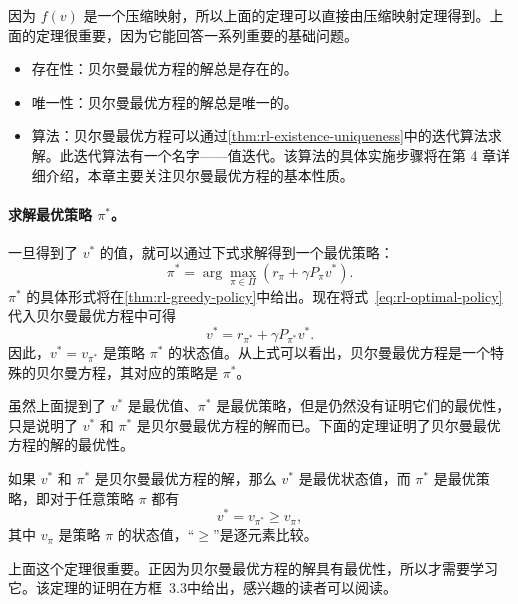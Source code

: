 因为 $f(v)$ 是一个压缩映射，所以上面的定理可以直接由压缩映射定理得到。上面的定理很重要，因为它能回答一系列重要的基础问题。
\begin{itemize}
  \item 存在性：贝尔曼最优方程的解总是存在的。
  \item 唯一性：贝尔曼最优方程的解总是唯一的。
  \item 算法：贝尔曼最优方程可以通过\cref{thm:rl-existence-uniqueness}中的迭代算法求解。此迭代算法有一个名字——值迭代。该算法的具体实施步骤将在第 4 章详细介绍，本章主要关注贝尔曼最优方程的基本性质。
\end{itemize}

\paragraph{求解最优策略 $\pi^*$。}一旦得到了 $v^*$ 的值，就可以通过下式求解得到一个最优策略：
\begin{equation}
  \pi^* = \arg\max_{\pi \in \varPi} (r_\pi + \gamma P_\pi v^*).
\label{eq:rl-optimal-policy}
\end{equation}
$\pi^*$ 的具体形式将在\cref{thm:rl-greedy-policy}中给出。现在将式~\eqref{eq:rl-optimal-policy}代入贝尔曼最优方程中可得
\begin{equation}
  v^* = r_{\pi^*} + \gamma P_{\pi^*} v^*.
\end{equation}
因此，$v^* = v_{\pi^*}$ 是策略 $\pi^*$ 的状态值。从上式可以看出，贝尔曼最优方程是一个特殊的贝尔曼方程，其对应的策略是 $\pi^*$。

虽然上面提到了 $v^*$ 是最优值、$\pi^*$ 是最优策略，但是仍然没有证明它们的最优性，只是说明了 $v^*$ 和 $\pi^*$ 是贝尔曼最优方程的解而已。下面的定理证明了贝尔曼最优方程的解的最优性。

\begin{theorem}[$v^*$ 和 $\pi^*$ 的最优性]
\label{thm:rl-optimality}
如果 $v^*$ 和 $\pi^*$ 是贝尔曼最优方程的解，那么 $v^*$ 是最优状态值，而 $\pi^*$ 是最优策略，即对于任意策略 $\pi$ 都有
\begin{equation}
  v^* = v_{\pi^*} \geqslant v_\pi,
\end{equation}
其中 $v_\pi$ 是策略 $\pi$ 的状态值，“$\geqslant$”是逐元素比较。
\end{theorem}

上面这个定理很重要。正因为贝尔曼最优方程的解具有最优性，所以才需要学习它。该定理的证明在方框~3.3中给出，感兴趣的读者可以阅读。

